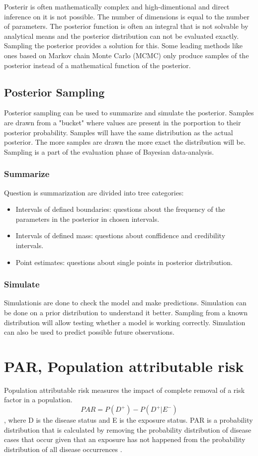 Posterir is often mathematically complex and high-dimentional and direct inference on it is not possible. The number of dimensions is equal to the number of parameters. The posterior function is often an integral that is not solvable by analytical means and the posterior distribution can not be evaluated exactly. Sampling the posterior provides a solution for this.\cite{vandeSchoot2020BayesianSA}
Some leading methods like ones based on Markov chain Monte Carlo (MCMC) only produce samples of the posterior instead of a mathematical function of the posterior.\cite{Mcelreath2015StatisticalRA}

\subsection{Posterior Sampling}\label{PosteriorSampling}
Posterior sampling can be used to summarize and simulate the posterior. Samples are drawn from a "bucket" where values are present in the porportion to their posterior probability. Samples will have the same distribution as the actual posterior. The more samples are drawn the more exact the distribution will be. Sampling is a part of the evaluation phase of Bayesian data-analysis.
\subsubsection*{Summarize}
Question is summarization are divided into tree categories: 
\begin{itemize}
    \item Intervals of defined boundaries: questions about the frequency of the parameters in the posterior in chosen intervals.
    \item Intervals of defined mass: questions about conffidence and credibility intervals. 
    \item Point estimates: questions about single points in posterior distribution.
\end{itemize}
\subsubsection*{Simulate}
Simulationis are done to check the model and make predictions. Simulation can be done on a prior distribution to understand it better. Sampling from a known distribution will allow testing whether a model is working correctly. Simulation can also be used to predict possible future observations. \cite{Mcelreath2015StatisticalRA}
\section{PAR, Population attributable risk}\label{PAR}
Population attributable risk measures the impact of complete removal of a risk factor in a population. 
\begin{equation} \label{PARequation}
PAR = P(D^+) - P(D^+| E^-)
\end{equation}
, where D is the disease status and E is the exposure status. PAR is a probability distribution that is calculated by removing the probability distribution of disease cases that occur given that an exposure has not happened from the probability distribution of all disease occurrences . \cite{Pirikahu2016BayesianMO}
